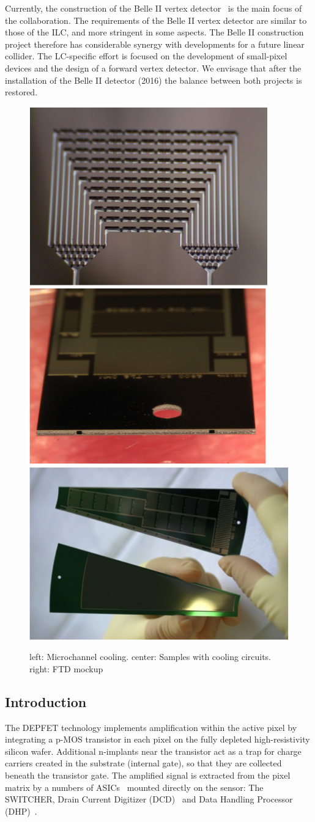 Currently, the construction of the Belle II vertex detector~\cite{Abe:2010gxa} is the main focus of the collaboration. The requirements of the Belle II vertex detector are similar to those of the ILC, and more stringent in some aspects. The Belle II construction project therefore has considerable synergy with developments for a future linear collider. The LC-specific effort is focused on the development of small-pixel devices and the design of a forward vertex detector. We envisage that after the installation of the Belle II detector (2016) the balance between both projects is restored.

\begin{figure}
    \centering
    \includegraphics[width=.3\linewidth]{VertexDetector/DEPFET/microChannel}
    \includegraphics[width=.3\linewidth]{VertexDetector/DEPFET/microChannelSamples}
    \includegraphics[width=.3\linewidth]{VertexDetector/DEPFET/FTD_Mockup}
    \caption{left: Microchannel cooling. center: Samples with cooling circuits. right: FTD mockup}
    \label{fig:VertexDetector:DEPFET}
\end{figure}

\subsection{Introduction}
The DEPFET technology implements amplification within the active pixel by integrating a p-MOS transistor in each pixel on the fully depleted high-resistivity silicon wafer. Additional n-implants near the transistor act as a trap for charge carriers created in the substrate (internal gate), so that they are collected beneath the transistor gate. The amplified signal is extracted from the pixel matrix by a numbers of ASICs~\cite{Kishishita:2014maa,Krueger2010337} mounted directly on the sensor: The SWITCHER, Drain Current Digitizer (DCD)~\cite{1748-0221-6-01-C01085,5446501} and Data Handling Processor (DHP)~\cite{1748-0221-7-01-C01069}.



